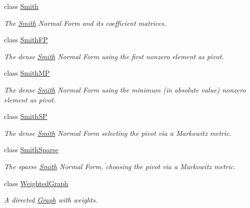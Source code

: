 \begin{DoxyCompactItemize}
class \hyperlink{classMackey_1_1Smith}{Smith}
\begin{DoxyCompactList}\small\item\em The \hyperlink{classMackey_1_1Smith}{Smith} Normal Form and its coefficient matrices. \end{DoxyCompactList}\item 
class \hyperlink{classMackey_1_1SmithFP}{Smith\+FP}
\begin{DoxyCompactList}\small\item\em The dense \hyperlink{classMackey_1_1Smith}{Smith} Normal Form using the first nonzero element as pivot. \end{DoxyCompactList}\item 
class \hyperlink{classMackey_1_1SmithMP}{Smith\+MP}
\begin{DoxyCompactList}\small\item\em The dense \hyperlink{classMackey_1_1Smith}{Smith} Normal Form using the minimum (in absolute value) nonzero element as pivot. \end{DoxyCompactList}\item 
class \hyperlink{classMackey_1_1SmithSP}{Smith\+SP}
\begin{DoxyCompactList}\small\item\em The dense \hyperlink{classMackey_1_1Smith}{Smith} Normal Form selecting the pivot via a Markowitz metric. \end{DoxyCompactList}\item 
class \hyperlink{classMackey_1_1SmithSparse}{Smith\+Sparse}
\begin{DoxyCompactList}\small\item\em The sparse \hyperlink{classMackey_1_1Smith}{Smith} Normal Form, choosing the pivot via a Markowitz metric. \end{DoxyCompactList}\item 
class \hyperlink{classMackey_1_1WeightedGraph}{Weighted\+Graph}
\begin{DoxyCompactList}\small\item\em A directed \hyperlink{classMackey_1_1Graph}{Graph} with weights. \end{DoxyCompactList}\end{DoxyCompactItemize}
